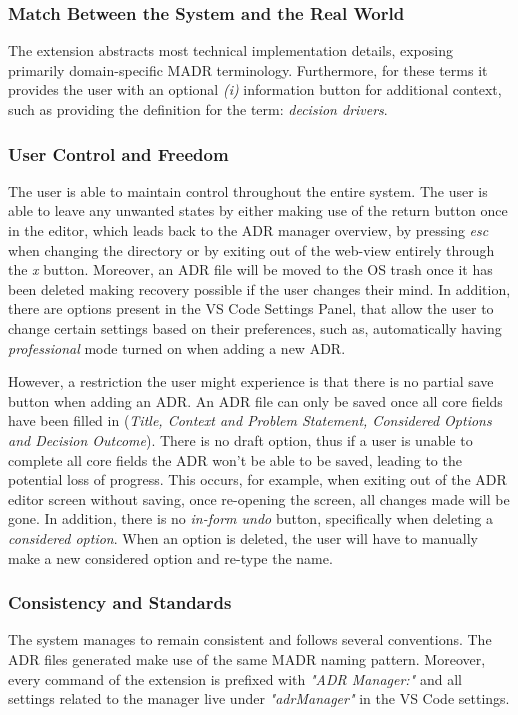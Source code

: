 \documentclass{article}
\begin{document}
\subsubsection{Match Between the System and the Real World} \label{Match between the system and the real world}
The extension abstracts most technical implementation details, exposing primarily domain-specific MADR terminology. Furthermore, for these terms it provides the user with an optional \textit{(i)} information button for additional context, such as providing the definition for the term: \textit{decision drivers}.

\subsubsection{User Control and Freedom}
The user is able to maintain control throughout the entire system. The user is able to leave any unwanted states by either making use of the return button once in the editor, which leads back to the ADR manager overview, by pressing \textit{esc} when changing the directory or by exiting out of the web-view entirely through the \textit{x} button. Moreover, an ADR file will be moved to the OS trash once it has been deleted making recovery possible if the user changes their mind. In addition, there are options present in the VS Code Settings Panel, that allow the user to change certain settings based on their preferences, such as, automatically having \textit{professional} mode turned on when adding a new ADR.

However, a restriction the user might experience is that there is no partial save button when adding an ADR. An ADR file can only be saved once all core fields have been filled in (\textit{Title, Context and Problem Statement, Considered Options and Decision Outcome}). There is no draft option, thus if a user is unable to complete all core fields the ADR won't be able to be saved, leading to the potential loss of progress. This occurs, for example, when exiting out of the ADR editor screen without saving, once re-opening the screen, all changes made will be gone. In addition, there is no \textit{in-form undo} button, specifically when deleting a \textit{considered option}. When an option is deleted, the user will have to manually make a new considered option and re-type the name.

\subsubsection{Consistency and Standards}
The system manages to remain consistent and follows several conventions. The ADR files generated make use of the same MADR naming pattern. Moreover, every command of the extension is prefixed with \textit{"ADR Manager:"} and all settings related to the manager live under \textit{"adrManager"} in the VS Code settings.
\end{document}
